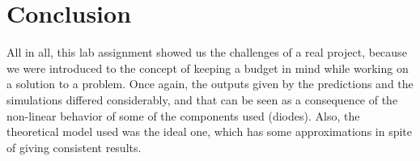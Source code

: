 \section{Conclusion}

All in all, this lab assignment showed us the challenges of a real project, because we were introduced to the concept of keeping a budget in mind while working on a solution to a problem. Once again, the outputs given by the predictions and the simulations differed considerably, and that can be seen as a consequence of the non-linear behavior of some of the components used (diodes). Also, the theoretical model used was the ideal one, which has some approximations in spite of giving consistent results.

